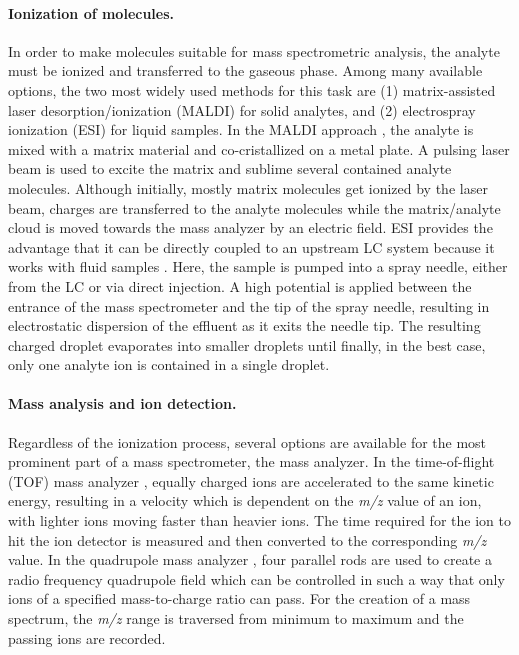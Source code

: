 \paragraph{Ionization of molecules.}

In order to make molecules suitable for mass spectrometric analysis, 
the analyte must be ionized and transferred to the gaseous phase.
Among many available options, the two most widely used methods for this 
task are (1) matrix-assisted laser desorption/ionization (MALDI) for solid 
analytes, and (2) electrospray ionization (ESI) for liquid samples.
In the MALDI approach \citep{Karas1988}, the analyte is mixed with a 
matrix material and co-cristallized on a metal plate. 
A pulsing laser beam is used to excite the matrix and sublime several 
contained analyte molecules. 
Although initially, mostly matrix molecules get ionized by the laser
beam, charges are transferred to the analyte molecules while the
matrix/analyte cloud is moved towards the mass analyzer by an
electric field.
ESI provides the advantage that it can be directly coupled to an
upstream LC system because it works with fluid samples \citep{Fenn1989}.
Here, the sample is pumped into a spray needle, either from the LC or via
direct injection. 
A high potential is applied between the entrance of the mass spectrometer and
the tip of the spray needle, resulting in electrostatic dispersion of the
effluent as it exits the needle tip.
The resulting charged droplet evaporates into smaller droplets until finally,
in the best case, only one analyte ion is contained in a single droplet.

\paragraph{Mass analysis and ion detection.}

Regardless of the ionization process, several options are available for
the most prominent part of a mass spectrometer, the mass analyzer.
In the time-of-flight (TOF) mass analyzer \citep{Wolff1953}, equally charged 
ions are accelerated to the same kinetic energy, resulting in a velocity 
which is dependent on the {\em m/z} value of an ion, with lighter ions
moving faster than heavier ions.
The time required for the ion to hit the ion detector is measured and
then converted to the corresponding {\em m/z} value.
In the quadrupole mass analyzer \citep{Paul1956}, four parallel rods are 
used to create a radio frequency quadrupole field which can be controlled
in such a way that only ions of a specified mass-to-charge ratio can pass.
For the creation of a mass spectrum, the {\em m/z} range is traversed from
minimum to maximum and the passing ions are recorded.

